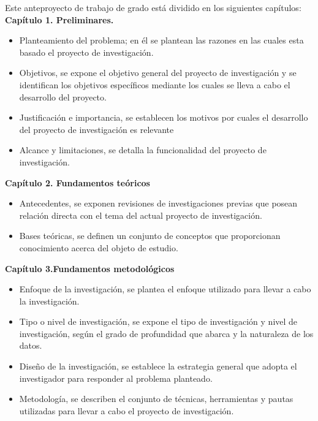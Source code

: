 Este anteproyecto de trabajo de grado está dividido en los siguientes capítulos:\\

\textbf{Capítulo 1. Preliminares. }
\begin{itemize}
\item {Planteamiento del problema; en él se plantean las razones en las cuales esta basado el proyecto de investigación.}
\item {Objetivos, se expone el objetivo general del proyecto de investigación y se identifican los objetivos específicos mediante los cuales se lleva a cabo el desarrollo del proyecto.}
\item {Justificación e importancia, se establecen los motivos por cuales el desarrollo del proyecto de investigación es relevante}
\item {Alcance y limitaciones, se detalla la funcionalidad del proyecto de investigación.}
\end{itemize}
\textbf{Capítulo 2. Fundamentos teóricos}
\begin{itemize}
\item {Antecedentes, se exponen revisiones de investigaciones previas que posean relación directa con el tema del actual proyecto de investigación.}
\item {Bases teóricas, se definen un conjunto de conceptos que proporcionan conocimiento acerca del objeto de estudio.}
\end{itemize}
\textbf{Capítulo 3.Fundamentos metodológicos}
\begin{itemize}
\item {Enfoque de la investigación, se plantea el enfoque utilizado para llevar a cabo la investigación.}
\item {Tipo o nivel de investigación, se expone el tipo de investigación y nivel de investigación, según el grado de profundidad que abarca y la naturaleza de los datos.}
\item {Diseño de la investigación, se establece la estrategia general que adopta el investigador para responder al problema planteado.}
\item {Metodología, se describen el conjunto de técnicas, herramientas y pautas utilizadas para llevar a cabo el proyecto de investigación.}
\end{itemize}